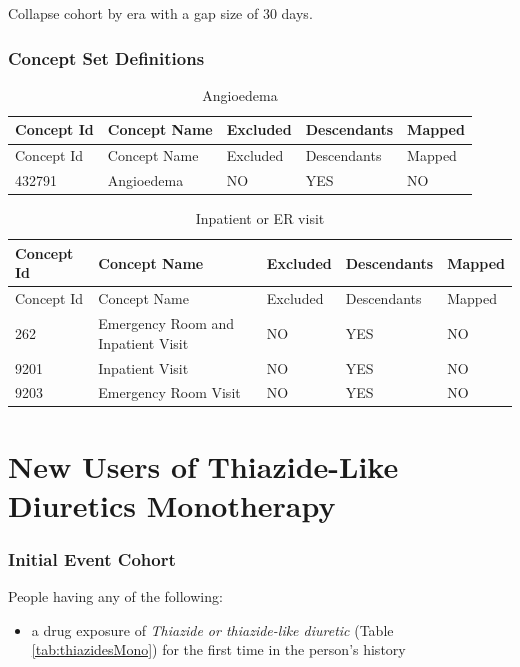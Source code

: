 \documentclass[11pt]{book}
\providecommand{\tightlist}{%
  \setlength{\itemsep}{0pt}\setlength{\parskip}{0pt}}
\theoremstyle{definition}
\theoremstyle{definition}
\theoremstyle{definition}
\theoremstyle{remark}
\begin{document}
Collapse cohort by era with a gap size of 30 days.

\subsubsection*{Concept Set
Definitions}\label{concept-set-definitions-3}

\begin{longtable}[]{@{}lllll@{}}
\caption{\label{tab:angioedema} Angioedema}\tabularnewline
\toprule
Concept Id & Concept Name & Excluded & Descendants &
Mapped\tabularnewline
\midrule
\endfirsthead
\toprule
Concept Id & Concept Name & Excluded & Descendants &
Mapped\tabularnewline
\midrule
\endhead
432791 & Angioedema & NO & YES & NO\tabularnewline
\bottomrule
\end{longtable}

\begin{longtable}[]{@{}lllll@{}}
\caption{\label{tab:inpatientOrEr} Inpatient or ER visit}\tabularnewline
\toprule
Concept Id & Concept Name & Excluded & Descendants &
Mapped\tabularnewline
\midrule
\endfirsthead
\toprule
Concept Id & Concept Name & Excluded & Descendants &
Mapped\tabularnewline
\midrule
\endhead
262 & Emergency Room and Inpatient Visit & NO & YES & NO\tabularnewline
9201 & Inpatient Visit & NO & YES & NO\tabularnewline
9203 & Emergency Room Visit & NO & YES & NO\tabularnewline
\bottomrule
\end{longtable}

\section{New Users of Thiazide-Like Diuretics
Monotherapy}\label{ThiazidesMono}

\subsubsection*{Initial Event Cohort}\label{initial-event-cohort-4}

People having any of the following:

\begin{itemize}
\tightlist
\item
  a drug exposure of \emph{Thiazide or thiazide-like diuretic} (Table
  \ref{tab:thiazidesMono}) for the first time in the person's history
\end{itemize}
\end{document}

